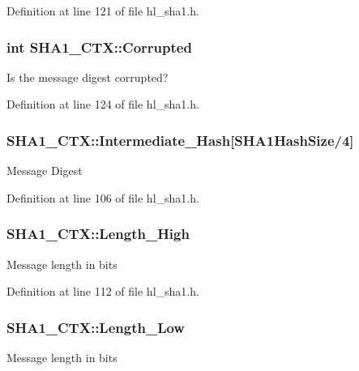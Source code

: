 Definition at line 121 of file hl\_\-sha1.h.\hypertarget{struct_s_h_a1___c_t_x_adfe095bb242ae3900dcecf9fe137f6e8}{
\subsubsection[{Corrupted}]{\setlength{\rightskip}{0pt plus 5cm}int {\bf SHA1\_\-CTX::Corrupted}}}
\label{struct_s_h_a1___c_t_x_adfe095bb242ae3900dcecf9fe137f6e8}
Is the message digest corrupted? 

Definition at line 124 of file hl\_\-sha1.h.\hypertarget{struct_s_h_a1___c_t_x_a002bb4717d18473dd068b0107fad99fb}{
\subsubsection[{Intermediate\_\-Hash}]{ {\bf SHA1\_\-CTX::Intermediate\_\-Hash}\mbox{[}SHA1HashSize/4\mbox{]}}}
\label{struct_s_h_a1___c_t_x_a002bb4717d18473dd068b0107fad99fb}
Message Digest 

Definition at line 106 of file hl\_\-sha1.h.\hypertarget{struct_s_h_a1___c_t_x_a0cf6238687324137a7af1d551a035c5e}{
\subsubsection[{Length\_\-High}]{ {\bf SHA1\_\-CTX::Length\_\-High}}}
\label{struct_s_h_a1___c_t_x_a0cf6238687324137a7af1d551a035c5e}
Message length in bits 

Definition at line 112 of file hl\_\-sha1.h.\hypertarget{struct_s_h_a1___c_t_x_ad7fa6a9c4bc5b5a973e43f295d47130b}{
\subsubsection[{Length\_\-Low}]{ {\bf SHA1\_\-CTX::Length\_\-Low}}}
\label{struct_s_h_a1___c_t_x_ad7fa6a9c4bc5b5a973e43f295d47130b}
Message length in bits 

